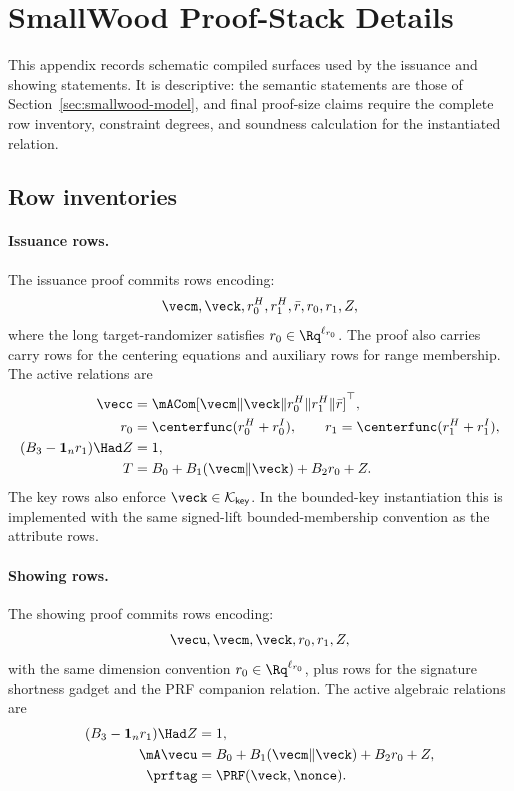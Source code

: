 \section{SmallWood Proof-Stack Details}
\label{app:smallwood}

This appendix records schematic compiled surfaces used by the issuance and showing statements.  It is descriptive:
the semantic statements are those of Section~\ref{sec:smallwood-model}, and final proof-size claims require the
complete row inventory, constraint degrees, and soundness calculation for the instantiated relation.

\subsection{Row inventories}
\paragraph{Issuance rows.}
The issuance proof commits rows encoding:
\[
  \vecm,
  \veck,
  r_0^H,
  r_1^H,
  \bar r,
  r_0,
  r_1,
  Z,
\]
where the long target-randomizer satisfies $r_0\in\Rq^{\ell_{r_0}}$.  The proof also carries carry rows for the
centering equations and auxiliary rows for range membership.  The active relations are
\begin{align*}
  \vecc&=\mACom[\vecm\Vert\veck\Vert r_0^H\Vert r_1^H\Vert\bar r]^\top,\\
  r_0&=\centerfunc(r_0^H+r_0^I),\qquad r_1=\centerfunc(r_1^H+r_1^I),\\
  (B_3-\mathbf 1_n r_1)\Had Z&=1,\\
  T&=B_0+B_1(\vecm\Vert\veck)+B_2r_0+Z.
\end{align*}
The key rows also enforce \(\veck\in\mathcal K_{\mathsf{key}}\).  In the bounded-key instantiation this is
implemented with the same signed-lift bounded-membership convention as the attribute rows.

\paragraph{Showing rows.}
The showing proof commits rows encoding:
\[
  \vecu,
  \vecm,
  \veck,
  r_0,
  r_1,
  Z,
\]
with the same dimension convention $r_0\in\Rq^{\ell_{r_0}}$, plus rows for the signature shortness gadget and the
PRF companion relation.  The active algebraic relations are
\begin{align*}
  (B_3-\mathbf 1_n r_1)\Had Z&=1,\\
  \mA\vecu&=B_0+B_1(\vecm\Vert\veck)+B_2r_0+Z,\\
  \prftag&=\PRF(\veck,\nonce).
\end{align*}

